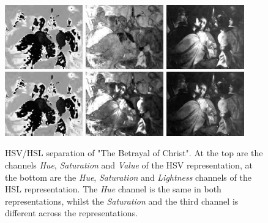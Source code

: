 \documentclass[11pt,a4paper,twoside,openright]{report}
\begin{document}
\begin{figure}[tbp]
\centering
\includegraphics[width=0.30\textwidth]{H_caravaggio_1962_139_1}
\includegraphics[width=0.30\textwidth]{SHSV_caravaggio_1962_139_1}
\includegraphics[width=0.30\textwidth]{V_caravaggio_1962_139_1}
\includegraphics[width=0.30\textwidth]{H_caravaggio_1962_139_1}
\includegraphics[width=0.30\textwidth]{SHSL_caravaggio_1962_139_1}
\includegraphics[width=0.30\textwidth]{L_caravaggio_1962_139_1}
\caption[HSV/HSL separation]{HSV/HSL separation of "The Betrayal of Christ".
At the top are the channels \emph{Hue}, \emph{Saturation} and \emph{Value} of
the HSV representation, at the bottom are the \emph{Hue}, \emph{Saturation} and
\emph{Lightness} channels of the HSL representation.  The \emph{Hue} channel is
the same in both representations, whilst the \emph{Saturation} and the third
channel is different across the representations.}
\label{fig:hsvl}
\end{figure}
\end{document}
